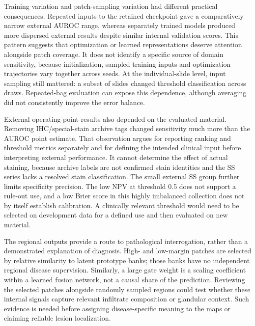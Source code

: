 Training variation and patch-sampling variation had different practical consequences. Repeated inputs to the retained checkpoint gave a comparatively narrow external AUROC range, whereas separately trained models produced more dispersed external results despite similar internal validation scores. This pattern suggests that optimization or learned representations deserve attention alongside patch coverage. It does not identify a specific source of domain sensitivity, because initialization, sampled training inputs and optimization trajectories vary together across seeds. At the individual-slide level, input sampling still mattered: a subset of slides changed threshold classification across draws. Repeated-bag evaluation can expose this dependence, although averaging did not consistently improve the error balance.

External operating-point results also depended on the evaluated material. Removing IHC/special-stain archive tags changed sensitivity much more than the AUROC point estimate. That observation argues for reporting ranking and threshold metrics separately and for defining the intended clinical input before interpreting external performance. It cannot determine the effect of actual staining, because archive labels are not confirmed stain identities and the SS series lacks a resolved stain classification. The small external SS group further limits specificity precision. The low NPV at threshold 0.5 does not support a rule-out use, and a low Brier score in this highly imbalanced collection does not by itself establish calibration. A clinically relevant threshold would need to be selected on development data for a defined use and then evaluated on new material.

The regional outputs provide a route to pathological interrogation, rather than a demonstrated explanation of diagnosis. High- and low-margin patches are selected by relative similarity to latent prototype banks; those banks have no independent regional disease supervision. Similarly, a large gate weight is a scaling coefficient within a learned fusion network, not a causal share of the prediction. Reviewing the selected patches alongside randomly sampled regions could test whether these internal signals capture relevant infiltrate composition or glandular context. Such evidence is needed before assigning disease-specific meaning to the maps or claiming reliable lesion localization.

